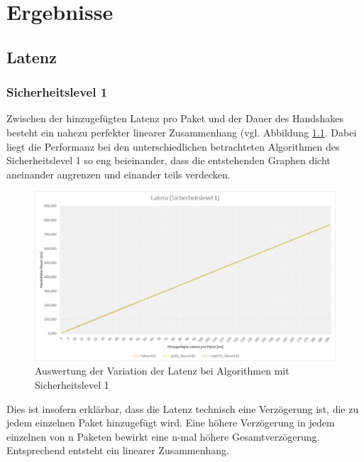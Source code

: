 \chapter{Ergebnisse}
\label{ch:ergebnis}

	\section{Latenz}
	\label{sec:ergebnis:latenz}
	
		\subsection{Sicherheitslevel 1}
		\label{subsec:ergebnis:latenz:sl1}
		
		Zwischen der hinzugefügten Latenz pro Paket und der Dauer des Handshakes besteht ein nahezu perfekter 				linearer Zusammenhang (vgl. Abbildung \ref{fig:ergebnis:latenz:sl1}. Dabei liegt die Performanz bei den 		unterschiedlichen betrachteten Algorithmen des Sicherheitslevel 1 so eng beieinander, dass die 					entstehenden Graphen dicht aneinander angrenzen und einander teils verdecken.\\
		
		\begin{figure}[htbp]
			\centering
			\includegraphics[width=\textwidth]{../auswertung/latenz_sl1.png}
			\caption{Auswertung der Variation der Latenz bei Algorithmen mit Sicherheitslevel 1}
			\label{fig:ergebnis:latenz:sl1}
		\end{figure}
		
		Dies ist insofern erklärbar, dass die Latenz technisch eine Verzögerung ist, die zu jedem einzelnen 				Paket hinzugefügt wird. Eine höhere Verzögerung in jedem einzelnen von n Paketen bewirkt eine n-mal 				höhere Gesamtverzögerung. Entsprechend entsteht ein linearer Zusammenhang.\\
		
